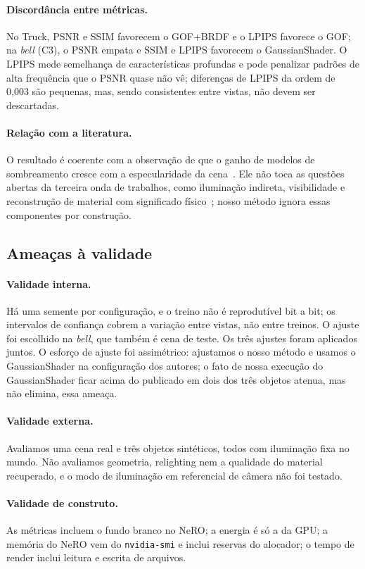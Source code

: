 \documentclass[12pt]{article}
\begin{document}
\paragraph{Discordância entre métricas.}
No Truck, PSNR e SSIM favorecem o GOF+BRDF e o LPIPS favorece o GOF; na \emph{bell} (C3), o PSNR empata e SSIM e LPIPS favorecem o GaussianShader.
O LPIPS mede semelhança de características profundas e pode penalizar padrões de alta frequência que o PSNR quase não vê; diferenças de LPIPS da ordem de 0,003 são pequenas, mas, sendo consistentes entre vistas, não devem ser descartadas.

\paragraph{Relação com a literatura.}
O resultado é coerente com a observação de que o ganho de modelos de sombreamento cresce com a especularidade da cena~\cite{jiang2024gaussianshader}.
Ele não toca as questões abertas da terceira onda de trabalhos, como iluminação indireta, visibilidade e reconstrução de material com significado físico~\cite{gu2025irgs,zhu2026ptirgs,han2026radiometric}; nosso método ignora essas componentes por construção.

\subsection{Ameaças à validade}
\paragraph{Validade interna.}
Há uma semente por configuração, e o treino não é reprodutível bit a bit; os intervalos de confiança cobrem a variação entre vistas, não entre treinos.
O ajuste foi escolhido na \emph{bell}, que também é cena de teste.
Os três ajustes foram aplicados juntos.
O esforço de ajuste foi assimétrico: ajustamos o nosso método e usamos o GaussianShader na configuração dos autores; o fato de nossa execução do GaussianShader ficar acima do publicado em dois dos três objetos atenua, mas não elimina, essa ameaça.
\paragraph{Validade externa.}
Avaliamos uma cena real e três objetos sintéticos, todos com iluminação fixa no mundo.
Não avaliamos geometria, relighting nem a qualidade do material recuperado, e o modo de iluminação em referencial de câmera não foi testado.
\paragraph{Validade de construto.}
As métricas incluem o fundo branco no NeRO; a energia é só a da GPU; a memória do NeRO vem do \texttt{nvidia-smi} e inclui reservas do alocador; o tempo de render inclui leitura e escrita de arquivos.
\end{document}
